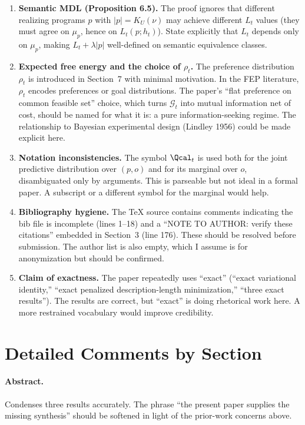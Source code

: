 \documentclass[11pt]{article}
\begin{document}
\begin{enumerate}[leftmargin=*]
\item \textbf{Semantic MDL (Proposition 6.5).} The proof ignores that different realizing programs $p$ with $|p| = K_U(\nu)$ may achieve different $L_t$ values (they must agree on $\mu_p$, hence on $L_t(p;h_t)$). State explicitly that $L_t$ depends only on $\mu_p$, making $L_t + \lambda|p|$ well-defined on semantic equivalence classes.

\item \textbf{Expected free energy and the choice of $\rho_t$.} The preference distribution $\rho_t$ is introduced in Section~7 with minimal motivation. In the FEP literature, $\rho_t$ encodes preferences or goal distributions. The paper's ``flat preference on common feasible set'' choice, which turns $\mathcal{G}_t$ into mutual information net of cost, should be named for what it is: a pure information-seeking regime. The relationship to Bayesian experimental design (Lindley 1956) could be made explicit here.

\item \textbf{Notation inconsistencies.} The symbol $\Qcal_t$ is used both for the joint predictive distribution over $(p,o)$ and for its marginal over $o$, disambiguated only by arguments. This is parseable but not ideal in a formal paper. A subscript or a different symbol for the marginal would help.

\item \textbf{Bibliography hygiene.} The TeX source contains comments indicating the bib file is incomplete (lines 1--18) and a ``NOTE TO AUTHOR: verify these citations'' embedded in Section~3 (line 176). These should be resolved before submission. The author list is also empty, which I assume is for anonymization but should be confirmed.

\item \textbf{Claim of exactness.} The paper repeatedly uses ``exact'' (``exact variational identity,'' ``exact penalized description-length minimization,'' ``three exact results''). The results are correct, but ``exact'' is doing rhetorical work here. A more restrained vocabulary would improve credibility.
\end{enumerate}

\section*{Detailed Comments by Section}

\paragraph{Abstract.} Condenses three results accurately. The phrase ``the present paper supplies the missing synthesis'' should be softened in light of the prior-work concerns above.
\end{document}
